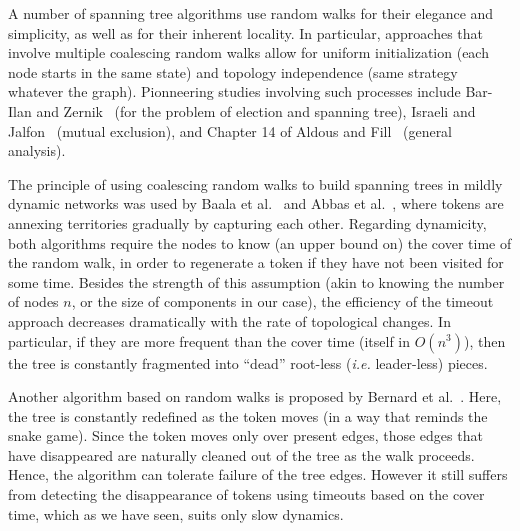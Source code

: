 \documentclass[twocolumn]{article}
\begin{document}
A number of spanning tree algorithms use random walks for their elegance and simplicity, as well as for their inherent locality. In particular, approaches that involve multiple coalescing random walks allow for uniform initialization (each node starts in the same state) and topology independence (same strategy whatever the graph). Pionneering studies involving such processes include Bar-Ilan and Zernik~\cite{BZ89} (for the problem of election and spanning tree), Israeli and Jalfon~\cite{IJ90} (mutual exclusion), and Chapter 14 of Aldous and Fill~\cite{AF02} (general analysis). 

The principle of using coalescing random walks to build spanning trees in mildly dynamic networks was used by Baala et al.~\cite{mosbah-tree} and Abbas et al.~\cite{Baala03}, where tokens are annexing territories gradually by capturing each other. Regarding dynamicity, both algorithms require the nodes to know (an upper bound on) the cover time of the random walk, in order to regenerate a token if they have not been visited for some time. Besides the strength of this assumption (akin to knowing the number of nodes $n$, or the size of components in our case), the efficiency of the timeout approach decreases dramatically with the rate of topological changes. In particular, if they are more frequent than the cover time (itself in $O(n^3)$), then the tree is constantly fragmented into ``dead'' root-less ({\it i.e.} leader-less) pieces.







Another algorithm based on random walks is proposed by Bernard et al.~\cite{BBS13}. Here, the tree is constantly redefined as the token moves (in a way that reminds the snake game). Since the token moves only over present edges, those edges that have disappeared are naturally cleaned out of the tree as the walk proceeds. Hence, the algorithm can tolerate failure of the tree edges. However it still suffers from detecting the disappearance of tokens using timeouts based on the cover time, which as we have seen, suits only slow dynamics.
\end{document}
